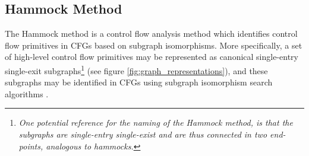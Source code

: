 
\subsection{Hammock Method}
\label{sec:hammock_method}

The Hammock method is a control flow analysis method which identifies control flow primitives in CFGs based on subgraph isomorphisms. More specifically, a set of high-level control flow primitives may be represented as canonical single-entry single-exit subgraphs\footnote{\textit{One potential reference for the naming of the Hammock method, is that the subgraphs are single-entry single-exist and are thus connected in two end-points, analogous to hammocks.}} (see figure \ref{fig:graph_representations}), and these subgraphs may be identified in CFGs using subgraph isomorphism search algorithms \cite{node_splitting}.

